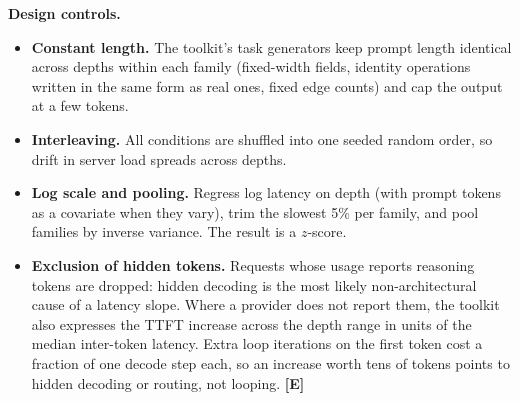 \documentclass[11pt,letterpaper]{article}
\newcommand{\mE}{\textcolor{deepindigo}{\textbf{[E]}}}
\begin{document}
\textbf{Design controls.}
\begin{itemize}
  \item \textbf{Constant length.} The toolkit's task generators keep prompt length identical across depths within each family (fixed-width fields, identity operations written in the same form as real ones, fixed edge counts) and cap the output at a few tokens.
  \item \textbf{Interleaving.} All conditions are shuffled into one seeded random order, so drift in server load spreads across depths.
  \item \textbf{Log scale and pooling.} Regress log latency on depth (with prompt tokens as a covariate when they vary), trim the slowest 5\% per family, and pool families by inverse variance. The result is a $z$-score.
  \item \textbf{Exclusion of hidden tokens.} Requests whose usage reports reasoning tokens are dropped: hidden decoding is the most likely non-architectural cause of a latency slope. Where a provider does not report them, the toolkit also expresses the TTFT increase across the depth range in units of the median inter-token latency. Extra loop iterations on the first token cost a fraction of one decode step each, so an increase worth tens of tokens points to hidden decoding or routing, not looping. \mE
\end{itemize}
\end{document}
